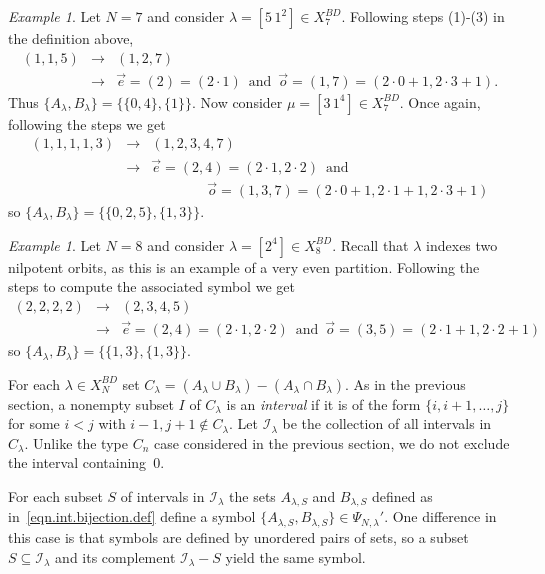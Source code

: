 \documentclass[reqno,11pt]{amsart}
\theoremstyle{remark}
\theoremstyle{remark}
\newtheorem{example}[Thm]{Example}
\theoremstyle{definition}
\theoremstyle{definition}
\theoremstyle{definition}
\numberwithin{equation}{section}
\newcommand{\ci}{\mathcal{I}}
\begin{document}
\begin{example} Let $N=7$ and consider $\lambda =[5\,1^2]\in X_7^{BD}$. Following steps (1)-(3) in the definition above,
\begin{eqnarray*}
(1,1,5) &\longrightarrow& (1,2,7)\\ &\longrightarrow& \vec{e} = (2) = (2\cdot 1) \, \text{ and } \, \vec{o} = (1,7) = (2\cdot 0+1, 2\cdot 3+1).
\end{eqnarray*}
Thus $\{A_{\lambda}, B_{\lambda}\} = \{\{0,4\}, \{1\}\}$. Now consider $\mu=[3\,1^4]\in X_{7}^{BD}$. Once again, following the steps we get
\begin{eqnarray*}
(1,1,1,1,3) &\longrightarrow& (1,2,3,4,7)\\ &\longrightarrow& \vec{e}=(2,4) = (2\cdot 1, 2\cdot 2) \, \text{ and } \, \\
&&\qquad\qquad \vec{o} = (1,3,7) = (2\cdot 0+1, 2\cdot 1 + 1, 2\cdot 3 +1)
\end{eqnarray*}
so $\{A_\lambda, B_\lambda\} = \{\{ 0,2,5 \},\{1,3\}\}$. 
\end{example}

\begin{example}\label{ex.VE} Let $N=8$ and consider $\lambda = [2^4]\in X_8^{BD}$.  Recall that $\lambda$ indexes two nilpotent orbits, as this is an example of a very even partition. Following the steps to compute the associated symbol we get
\begin{eqnarray*}
(2,2,2,2)&\longrightarrow& (2,3,4,5)\\ &\longrightarrow& \vec{e} = (2,4) = (2\cdot 1, 2\cdot 2) \, \text{ and } \, \vec{o} = (3,5) = (2\cdot 1+1, 2\cdot 2+1)
\end{eqnarray*}
so $\{A_\lambda, B_\lambda\} = \{\{1,3\},\{1,3\}\}$. 
\end{example}

For each $\lambda \in X_N^{BD}$ set $C_\lambda = (A_\lambda \cup B_\lambda)- (A_\lambda\cap B_{\lambda})$. As in the previous section, a nonempty subset $I$ of $C_\lambda$ is an 
\emph{interval} if it is of the form $\{i, i+1, \ldots, j\}$ for some $i<j$ with $i-1, j+1 \notin C_\lambda$. Let $\ci_\lambda$ be the collection of all intervals in $C_\lambda$. Unlike the type $C_n$ case considered in the previous section, we do not exclude the interval containing~$0$. 



For each subset $S$ of intervals in $\ci_\lambda$ the sets $A_{\lambda, S}$ and $B_{\lambda, S}$ defined as in~\eqref{eqn.int.bijection.def} define a symbol $\{A_{\lambda, S},B_{\lambda, S}\}\in \Psi_{N,\lambda}'$. One difference in this case is that symbols are defined by unordered pairs of sets, so a subset $S\subseteq \ci_\lambda$ and its complement $\ci_\lambda- S$ yield the same symbol. 
\end{document}
